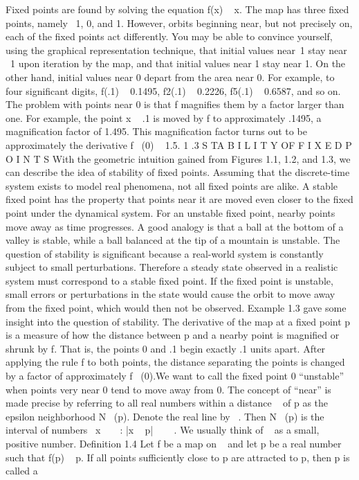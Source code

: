 \documentclass{article}
\begin{document}
Fixed points are found by solving the equation f(x)   x. The map has
three fixed points, namely  1, 0, and 1. However, orbits beginning near, but not
precisely on, each of the fixed points act differently. You may be able to convince
yourself, using the graphical representation technique, that initial values near 1
stay near  1 upon iteration by the map, and that initial values near 1 stay near 1.
On the other hand, initial values near 0 depart from the area near 0. For example,
to four significant digits, f(.1)   0.1495, f2(.1)   0.2226, f5(.1)   0.6587, and
so on. The problem with points near 0 is that f magnifies them by a factor
larger than one. For example, the point x   .1 is moved by f to approximately
.1495, a magnification factor of 1.495. This magnification factor turns out to be
approximately the derivative f  (0)   1.5.
1 .3 S TA B I L I T Y OF F I X E D P O I N T S
With the geometric intuition gained from Figures 1.1, 1.2, and 1.3, we can describe
the idea of stability of fixed points. Assuming that the discrete-time system exists
to model real phenomena, not all fixed points are alike. A stable fixed point has
the property that points near it are moved even closer to the fixed point under
the dynamical system. For an unstable fixed point, nearby points move away as
time progresses. A good analogy is that a ball at the bottom of a valley is stable,
while a ball balanced at the tip of a mountain is unstable.
The question of stability is significant because a real-world system is constantly
subject to small perturbations. Therefore a steady state observed in a
realistic system must correspond to a stable fixed point. If the fixed point is unstable,
small errors or perturbations in the state would cause the orbit to move away
from the fixed point, which would then not be observed.
Example 1.3 gave some insight into the question of stability. The derivative
of the map at a fixed point p is a measure of how the distance between p and a
nearby point is magnified or shrunk by f. That is, the points 0 and .1 begin exactly
.1 units apart. After applying the rule f to both points, the distance separating
the points is changed by a factor of approximately f  (0).We want to call the fixed
point 0 “unstable” when points very near 0 tend to move away from 0.
The concept of “near” is made precise by referring to all real numbers within
a distance   of p as the epsilon neighborhood N  (p). Denote the real line by  .
Then N  (p) is the interval of numbers  x     : |x   p|     . We usually think
of   as a small, positive number.
Definition 1.4 Let f be a map on   and let p be a real number such that
f(p)   p. If all points sufficiently close to p are attracted to p, then p is called a
\end{document}
